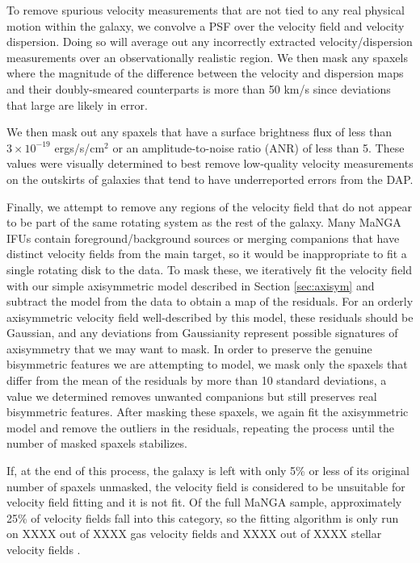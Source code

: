 To remove spurious velocity measurements that are not tied to any real physical motion within the galaxy, we convolve a PSF over the velocity field and velocity dispersion. Doing so will average out any incorrectly extracted velocity/dispersion measurements over an observationally realistic region. We then mask any spaxels where the magnitude of the difference between the velocity and dispersion maps and their doubly-smeared counterparts is more than 50 km/s since deviations that large are likely in error.

We then mask out any spaxels that have a surface brightness flux of less than $3 \times 10^{-19}$ ergs/s/cm$^2$ or an amplitude-to-noise ratio (ANR) of less than 5. These values were visually determined to best remove low-quality velocity measurements on the outskirts of galaxies that tend to have underreported errors from the DAP.

Finally, we attempt to remove any regions of the velocity field that do not appear to be part of the same rotating system as the rest of the galaxy. Many MaNGA IFUs contain foreground/background sources or merging companions that have distinct velocity fields from the main target, so it would be inappropriate to fit a single rotating disk to the data. To mask these, we iteratively fit the velocity field with our simple axisymmetric model described in Section \ref{sec:axisym} and subtract the model from the data to obtain a map of the residuals. For an orderly axisymmetric velocity field well-described by this model, these residuals should be Gaussian, and any deviations from Gaussianity represent possible signatures of axisymmetry that we may want to mask. In order to preserve the genuine bisymmetric features we are attempting to model, we mask only the spaxels that differ from the mean of the residuals by more than 10 standard deviations, a value we determined removes unwanted companions but still preserves real bisymmetric features. After masking these spaxels, we again fit the axisymmetric model and remove the outliers in the residuals, repeating the process until the number of masked spaxels stabilizes.

If, at the end of this process, the galaxy is left with only 5\% or less of its original number of spaxels unmasked, the velocity field is considered to be unsuitable for velocity field fitting and it is not fit. Of the full MaNGA sample, approximately 25\% of velocity fields fall into this category, so the fitting algorithm is only run on XXXX out of XXXX gas velocity fields and XXXX out of XXXX stellar velocity fields .

